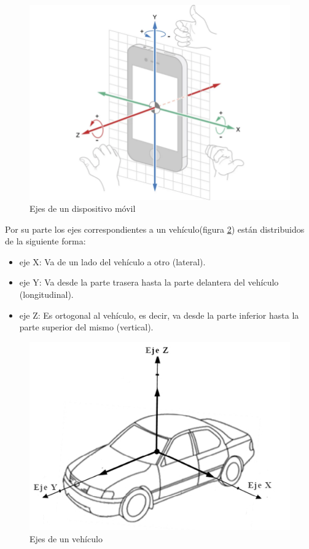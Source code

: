 	\begin{figure}[htb]
		\centering
		\includegraphics[scale = 0.4]{Graphics/mobile_phone_axis.png}
		\caption{Ejes de un dispositivo móvil}
		\label{fig:2}
	\end{figure}

	Por su parte los ejes correspondientes a un vehículo(figura \ref{fig:3}) están distribuidos de la siguiente forma:

	\begin{itemize}
		\item eje X: Va de un lado del vehículo a otro (lateral).
		\item eje Y: Va desde la parte trasera hasta la parte delantera del vehículo (longitudinal).
		\item eje Z: Es ortogonal al vehículo, es decir, va desde la parte inferior hasta la parte superior del mismo (vertical).
	\end{itemize}

	\begin{figure}[htb]
		\centering
		\includegraphics[scale = 0.4]{Graphics/car-axis.jpg}
		\caption{Ejes de un vehículo}
		\label{fig:3}
	\end{figure}


